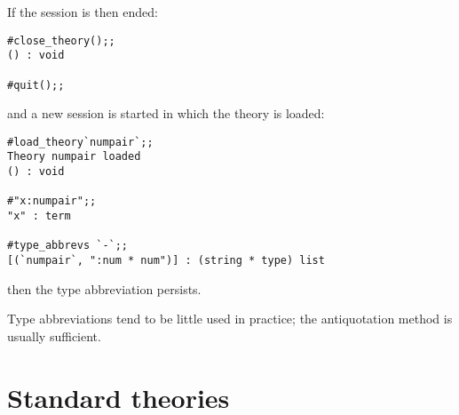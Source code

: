 \noindent If the session is then ended:

\begin{session}\begin{verbatim}
#close_theory();;
() : void

#quit();;
\end{verbatim}\end{session}

\noindent and a new session is started in which the theory  is
loaded:

\setcounter{sessioncount}{1}
\begin{session}\begin{verbatim}
#load_theory`numpair`;;
Theory numpair loaded
() : void

#"x:numpair";;
"x" : term

#type_abbrevs `-`;;
[(`numpair`, ":num * num")] : (string * type) list
\end{verbatim}\end{session}

\noindent then the type abbreviation persists.

Type abbreviations tend to be little used in practice; the antiquotation
method is usually sufficient.

\section{Standard theories}

